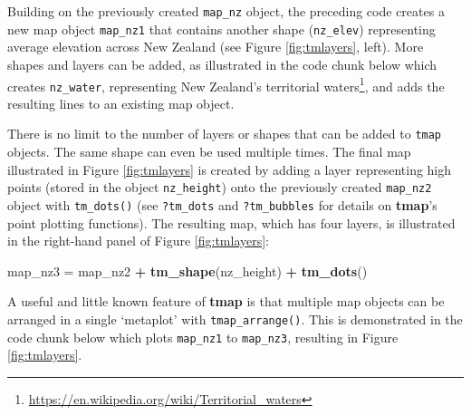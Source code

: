 \documentclass[]{krantz}
\newenvironment{Shaded}{\begin{snugshade}}{\end{snugshade}}
\newcommand{\DataTypeTok}[1]{\textcolor[rgb]{0.27,0.27,0.27}{#1}}
\newcommand{\DecValTok}[1]{\textcolor[rgb]{0.06,0.06,0.06}{#1}}
\newcommand{\KeywordTok}[1]{\textcolor[rgb]{0.27,0.27,0.27}{\textbf{#1}}}
\newcommand{\NormalTok}[1]{#1}
\newcommand{\OperatorTok}[1]{\textcolor[rgb]{0.43,0.43,0.43}{\textbf{#1}}}
\newcommand{\StringTok}[1]{\textcolor[rgb]{0.5,0.5,0.5}{#1}}
\let\rmarkdownfootnote\footnote%
\def\footnote{\protect\rmarkdownfootnote}
\renewcommand{\href}[2]{#2\footnote{\url{#1}}}
\begin{document}
Building on the previously created \texttt{map\_nz} object, the preceding code creates a new map object \texttt{map\_nz1} that contains another shape (\texttt{nz\_elev}) representing average elevation across New Zealand (see Figure \ref{fig:tmlayers}, left).
More shapes and layers can be added, as illustrated in the code chunk below which creates \texttt{nz\_water}, representing New Zealand's \href{https://en.wikipedia.org/wiki/Territorial_waters}{territorial waters}, and adds the resulting lines to an existing map object.

\begin{Shaded}
\end{Shaded}

There is no limit to the number of layers or shapes that can be added to \texttt{tmap} objects.
The same shape can even be used multiple times.
The final map illustrated in Figure \ref{fig:tmlayers} is created by adding a layer representing high points (stored in the object \texttt{nz\_height}) onto the previously created \texttt{map\_nz2} object with \texttt{tm\_dots()} (see \texttt{?tm\_dots} and \texttt{?tm\_bubbles} for details on \textbf{tmap}'s point plotting functions).
The resulting map, which has four layers, is illustrated in the right-hand panel of Figure \ref{fig:tmlayers}:

\begin{Shaded}
\begin{Highlighting}[]
\NormalTok{map_nz3 =}\StringTok{ }\NormalTok{map_nz2 }\OperatorTok{+}
\StringTok{  }\KeywordTok{tm_shape}\NormalTok{(nz_height) }\OperatorTok{+}\StringTok{ }\KeywordTok{tm_dots}\NormalTok{()}
\end{Highlighting}
\end{Shaded}

A useful and little known feature of \textbf{tmap} is that multiple map objects can be arranged in a single `metaplot' with \texttt{tmap\_arrange()}.
This is demonstrated in the code chunk below which plots \texttt{map\_nz1} to \texttt{map\_nz3}, resulting in Figure \ref{fig:tmlayers}.
\end{document}
